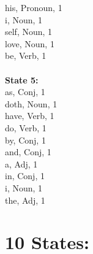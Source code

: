 \begin{multicols}{4}
his, Pronoun, 1\\
i, Noun, 1\\
self, Noun, 1\\
love, Noun, 1\\
be, Verb, 1\\
\\
\textbf{State 5:} \\
as, Conj, 1\\
doth, Noun, 1\\
have, Verb, 1\\
do, Verb, 1\\
by, Conj, 1\\
and, Conj, 1\\
a, Adj, 1\\
in, Conj, 1\\
i, Noun, 1\\
the, Adj, 1\\

\section{\textbf{10 States:}}


\end{multicols}
